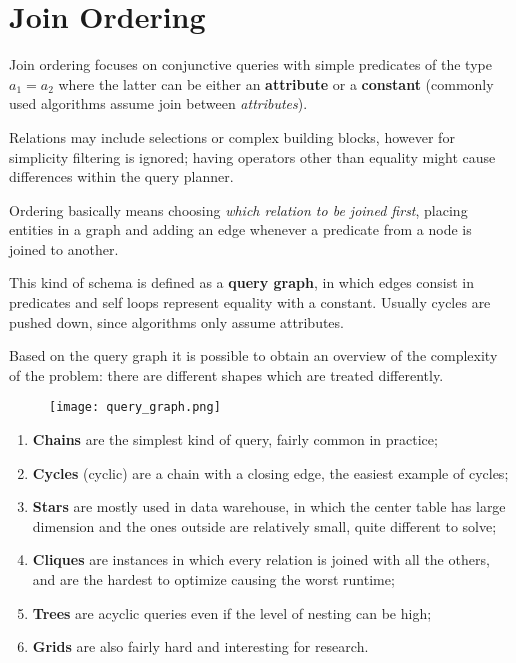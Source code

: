 \section{Join Ordering}
Join ordering focuses on conjunctive queries with simple predicates of the type $a_1 = a_2$ where the latter can be either an \textbf{attribute} or a \textbf{constant} (commonly used algorithms assume join between \textit{attributes}).

Relations may include selections or complex building blocks, however for simplicity filtering is ignored; having operators other than equality might cause differences within the query planner.

Ordering basically means choosing \textit{which relation to be joined first}, placing entities in a graph and adding an edge whenever a predicate from a node is joined to another. 

This kind of schema is defined as a \textbf{query graph}, in which edges consist in predicates and self loops represent equality with a constant. Usually cycles are pushed down, since algorithms only assume attributes. 

Based on the query graph it is possible to obtain an overview of the complexity of the problem: there are different shapes which are treated differently. 

\begin{figure}[h]
	\texttt{[image: query\_graph.png]}
	\centering
\end{figure}

\begin{enumerate}
	\item \textbf{Chains} are the simplest kind of query, fairly common in practice;
	\item \textbf{Cycles} (cyclic) are a chain with a closing edge, the easiest example of cycles;
	\item \textbf{Stars} are mostly used in data warehouse, in which the center table has large dimension and the ones outside are relatively small, quite different to solve;
	\item \textbf{Cliques} are instances in which every relation is joined with all the others, and are the hardest to optimize causing the worst runtime;
	\item \textbf{Trees} are acyclic queries even if the level of nesting can be high;
	\item \textbf{Grids} are also fairly hard and interesting for research.
\end{enumerate}

